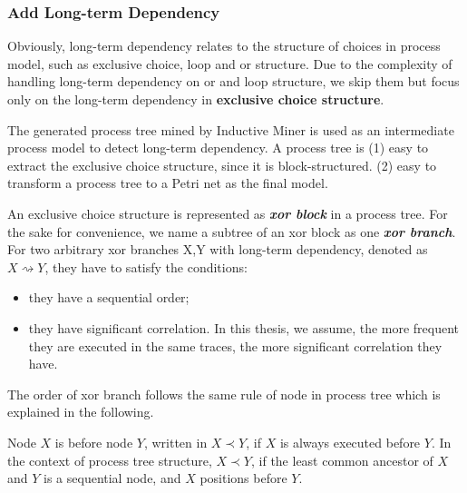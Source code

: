\subsubsection{Add Long-term Dependency}
Obviously, long-term dependency relates to the structure of choices in process model, such as exclusive choice, loop and or structure. Due to the complexity of handling long-term dependency on or and loop structure, we skip them but focus only on the long-term dependency in \textbf{exclusive choice structure}. 

The generated process tree mined by Inductive Miner is used as an intermediate process model to detect long-term dependency.  A process tree is  (1) easy to extract the exclusive choice structure, since it is block-structured. (2) easy to transform a process tree to a Petri net as the final model.

An exclusive choice structure is represented as \textbf{\emph{xor block}} in a process tree. For the sake for convenience, we name a subtree of an xor block as one \textbf{\emph{xor branch}}. %
For two arbitrary xor branches X,Y with long-term dependency, denoted as $ X\rightsquigarrow Y$, they have to satisfy the conditions: 
\begin{itemize}
	\item they have a sequential order;
	\item they have significant correlation. In this thesis, we assume, the more frequent they are executed in the same traces, the more significant correlation they have.
\end{itemize} 
The order of xor branch follows the same rule of node in process tree which is explained in the following.
\begin{definition}
	Node $X$ is before node $Y$, written in $X \prec Y$, if $X$ is always executed before $Y$.  In the context of process tree structure, $X \prec Y$, if the least common ancestor of $X$ and $Y$ is a sequential node, and $X$ positions before $Y$.
\end{definition} 


